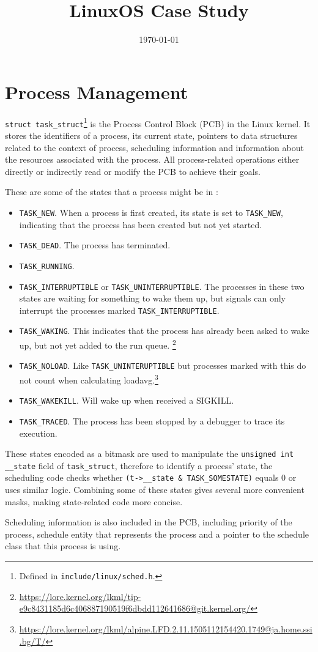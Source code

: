 \documentclass[11pt]{article}
\date{\today}
\title{Linux}
\begin{document}
\lstset{
	breaklines=true,
	basicstyle=\ttfamily}
\title{OS Case Study}

\maketitle
\tableofcontents

\newpage

\section{Process Management}
\lstinline{struct task_struct}\footnote{Defined in \lstinline{include/linux/sched.h}.\label{sched.h}} is the Process Control Block (PCB) in the Linux kernel.
It stores the identifiers of a process, its current state, pointers to data structures related to the context of process, scheduling information and information about the resources associated with the process.
All process-related operations either directly or indirectly read or modify the PCB to achieve their goals.

These are some of the states that a process might be in :
\begin{itemize}
	\item \lstinline{TASK_NEW}.
	      When a process is first created, its state is set to \lstinline{TASK_NEW}, indicating that the process has been created but not yet started.
	\item \lstinline{TASK_DEAD}.
	      The process has terminated.
	\item \lstinline{TASK_RUNNING}.
	\item \lstinline{TASK_INTERRUPTIBLE} or \lstinline{TASK_UNINTERRUPTIBLE}.
	      The processes in these two states are waiting for something to wake them up, but signals can only interrupt the processes marked \lstinline{TASK_INTERRUPTIBLE}.
	\item \lstinline{TASK_WAKING}.
	      This indicates that the process has already been asked to wake up, but not yet added to the run queue. \footnote{\url{https://lore.kernel.org/lkml/tip-e9c8431185d6c406887190519f6dbdd112641686@git.kernel.org/}}
	\item \lstinline{TASK_NOLOAD}.
	      Like \lstinline{TASK_UNINTERUPTIBLE} but processes marked with this do not count when calculating loadavg.\footnote{\url{https://lore.kernel.org/lkml/alpine.LFD.2.11.1505112154420.1749@ja.home.ssi.bg/T/}}
	\item \lstinline{TASK_WAKEKILL}.
	      Will wake up when received a SIGKILL.
	\item \lstinline{TASK_TRACED}.
	      The process has been stopped by a debugger to trace its execution.
\end{itemize}
These states encoded as a bitmask are used to manipulate the \lstinline{unsigned int __state} field of \lstinline{task_struct}, therefore to identify a process' state, the scheduling code checks whether \lstinline{(t->__state & TASK_SOMESTATE)} equals 0 or uses similar logic.
Combining some of these states gives several more convenient masks, making state-related code more concise.

Scheduling information is also included in the PCB, including priority of the process, schedule entity that represents the process and a pointer to the schedule class that this process is using.

\printbibliography[heading=bibintoc]

\newpage
\end{document}
